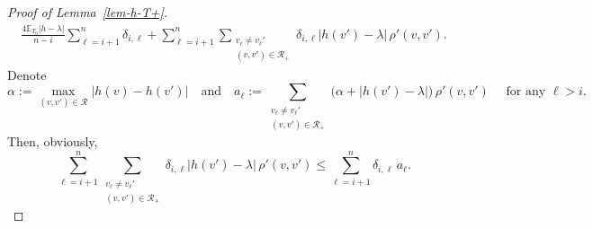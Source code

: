 \documentclass[12pt]{article}
\theoremstyle{definition}
\theoremstyle{plain}
\newcommand{\E}{\mathbb{E}}
\def\relation{{\mathcal R}}
\begin{document}
\begin{proof}[Proof of Lemma~\ref{lem-h-T+}]
\begin{align*}
\frac{4\E_{T_0}|h-\lambda|}{n-i} \sum_{\ell=i+1}^n \delta_{i,\ell}+\sum_{\ell=i+1}^n \sum_{\substack{v_\ell\neq v_{\ell}'\\(v,v')\in \relation_+}} 
\delta_{i,\ell}\big\vert h(v')-\lambda\big\vert\,\rho'(v,v').
\end{align*}
Denote
$$
\alpha:=\max_{(v,v')\in \relation} \vert h(v)-h(v')\vert \quad \text{and}\quad a_\ell:= \sum_{\substack{v_\ell\neq v_{\ell}'\\(v,v')\in \relation_+}} 
\big(\alpha+\big\vert h(v')-\lambda\big\vert\big)\, \rho'(v,v')\quad\text{ for any $\ell>i$.}
$$
Then, obviously,
\begin{equation}\label{eq1-lem-h-T+}
\sum_{\ell=i+1}^n \sum_{\substack{v_\ell\neq v_{\ell}'\\(v,v')\in \relation_+}} 
\delta_{i,\ell}\big\vert h(v')-\lambda\big\vert\,\rho'(v,v')
\leq \sum_{\ell=i+1}^n \delta_{i,\ell} \, a_\ell.
\end{equation}


\end{proof}
\end{document}
